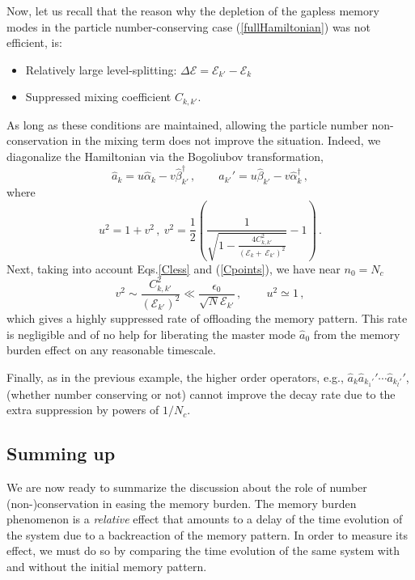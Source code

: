 \documentclass[aps,prd,reprint,superscriptaddress,nofootinbib]{revtex4-2}
\makeatletter
\newcommand*{\Eqs}{Eqs.\@\xspace}
\makeatother
\begin{document}
	Now, let us recall that the reason why the depletion of the gapless memory modes
	in the particle number-conserving case (\ref{fullHamiltonian}) was 
	not efficient,  is: 
	\begin{itemize}
		\item  Relatively large level-splitting: 
		$\Delta {\mathcal E} =  {\mathcal E}_{k'} - {\mathcal E}_{k}$
		\item Suppressed mixing coefficient $C_{k,k'}$. 
	\end{itemize}
	As long as these conditions are maintained,  
	allowing the particle number non-conservation in the mixing term does not improve the situation.    
	Indeed, we diagonalize the Hamiltonian via the Bogoliubov transformation,
	\begin{equation} 
	\hat{a}_k = u \hat{\alpha}_k - v \hat{\beta}_{k'}^{\dagger} \,,\qquad 
	\hat{a}_{k'}' =  u \hat{\beta}_{k'} - v \hat{\alpha}_k^{\dagger}  \,,   
	\end{equation} 
	where
	\begin{equation} 
	u^2 = 1+ v^2\,, ~ v^2 = \frac{1}{2} \left (\frac{1}{\sqrt{1 - \frac{4C_{k,k'}^2}{({\mathcal E}_k + \,  
				{\mathcal E}_{k'})^2}}}- 1\right) \,. 
	\end{equation} 
	Next, taking into account \Eqs \eqref{Cless} and (\ref{Cpoints}),  we have near $n_0=N_c$
	\begin{equation} 
	v^2 \sim  \frac{C_{k,k'}^2}{(  
		{\mathcal E}_{k'})^2} \ll \frac{\epsilon_0}{\sqrt{N} 	{\mathcal E}_{k'}}
	\,,\qquad\,
	u^2 \simeq 1\,, 
	\end{equation} 
	which gives a highly suppressed rate of offloading the memory pattern.
This rate is negligible and of no help for liberating 
the master mode $\hat{a}_0$ from the memory burden effect on 
any reasonable timescale.  

Finally, as in the previous example, the higher order operators, 
e.g.,   $\hat{a}_k\hat{a}_{k_1'}'\cdots \hat{a}_{k_l'}'$, 
(whether number conserving or not) cannot improve the decay rate due to 
the extra suppression by powers of $1/N_c$.  

\subsection{Summing up} 

We are now ready to summarize the discussion about the 
role of number (non-)conservation in easing the memory burden.  
The memory burden phenomenon is a {\it relative}  effect 
that amounts to a delay of the time evolution of the system
due to a backreaction of the memory pattern.  In order to measure its 
effect,  we must do so by comparing the time evolution of the
same system with and without the initial memory pattern.  
\end{document}
